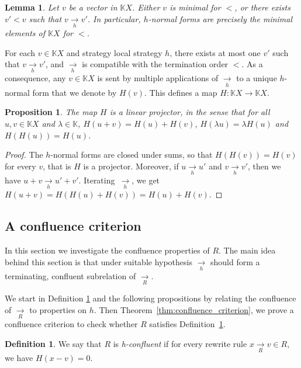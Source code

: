 \documentclass[10pt]{easychair}
\newtheorem{lemma}[theorem]{Lemma}
\newtheorem{proposition}[theorem]{Proposition}
\theoremstyle{definition}
\newtheorem{definition}[theorem]{Definition}
\newcommand\secDeuxDeux{A confluence criterion}
\newcommand\K{\mathbb{K}}
\newcommand\KX{\K X}
\newcommand\rewR{\underset{R}{\longrightarrow}}
\newcommand\rewh{\underset{h}{\longrightarrow}}
\begin{document}
\begin{lemma}\label{lem:h_normal_forms}
  Let $v$ be a vector in $\KX$. Either $v$ is minimal for $<$, or there exists $v'<v$ such that $v\rewh v'$. In particular, $h$-normal forms are
  precisely the minimal elements of $\KX$ for $<$. 
\end{lemma}

\medskip

For each $v\in\KX$ and strategy local strategy $h$, there exists at most one $v'$ such that $v \rewh v'$,
and $\rewh$ is compatible with the termination order $<$. As a
consequence, any $v \in \KX$ is sent by multiple applications of $\rewh$
to a unique $h$-normal form that we denote by $H(v)$. This defines a map
$H : \KX \to \KX$.  

\begin{proposition}\label{prop:linearity_of_H}
  The map $H$ is a linear projector, in the sense that for all $u,v \in \KX$ and $\lambda \in \K$, $H(u+v) = H(u) + H(v)$, $H(\lambda u) = \lambda H(u)$ and
  $H(H(u)) = H(u)$.
\end{proposition}

\begin{proof}
  The $h$-normal forms are closed under sums, so that $H(H(v))=H(v)$ for
  every $v$, that is $H$ is a projector. Moreover, if $u \rewh u'$ and
  $v \rewh v'$, then we have $u + v \rewh u' + v'$. Iterating~$\rewh$, we
  get $H(u + v) = H (H(u)+H(v))=H(u)+H(v)$. 
\end{proof}

\subsection{\secDeuxDeux}\label{sec:deuxDeux}

In this section we investigate the confluence properties of $R$.
The main idea behind this section is that under suitable hypothesis $\rewh$ should form a terminating, confluent subrelation of $\rewR$.

We start in Definition \ref{def:standardisation_property} and the following propositions by relating the confluence of $\rewR$ to properties on $h$.
Then Theorem~\ref{thm:confluence_criterion}, we prove a confluence
criterion to check whether $R$ satisfies Definition~\ref{def:standardisation_property}.

\begin{definition}\label{def:standardisation_property}
  We say that $R$ is \emph{h-confluent} if for every rewrite rule $x\rewR v\in R$, we have $H(x-v) = 0$.
\end{definition}
\end{document}
